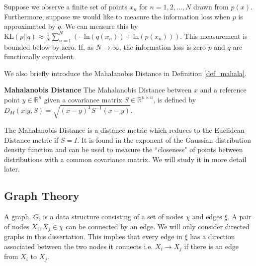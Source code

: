 \begin{thrm}
Suppose we observe a finite set of points $x_n$ for $n=1,2,..., N$ drawn from $p(x)$. Furthermore, suppose we would like to measure the information loss when $p$ is approximated by $q$. We can measure this by $\text{KL}(p||q) \approx \frac{1}{N}\sum_{n=1}^N\left(-\text{ln}(q(x_n)) + \text{ln}(p(x_n))\right)$. This measurement is bounded below by zero. If, as $N \rightarrow \infty$, the information loss is zero $p$ and $q$ are functionally equivalent.
\label{thrm_kl_sample}
\end{thrm}
We also briefly introduce the Mahalanobis Distance in Definition \ref{def_mahala}.
\begin{defn}
\textbf{Mahalanobis Distance} The Mahalanobis Distance between $x$ and a reference point $y \in \mathbb{R}^n$ given a covariance matrix $S \in \mathbb{R}^{n\times
n}$, is defined by $D_M(x|y, S) = \sqrt{(x-y)^TS^{-1}(x-y)}$. 
\label{def_mahala}
\end{defn}
The Mahalanobis Distance is a distance metric which reduces to the Euclidean Distance metric if $S=I$. It is found in the exponent of the Gaussian distribution density function and can be used to measure the ``closeness" of points between distributions with a common covariance matrix. We will study it in more detail later.
\subsection{Graph Theory}
\label{sec_graph_theory}
A graph, $G$, is a data structure consisting of a set of nodes $\chi$ and edges $\xi$. A pair of nodes $X_i, X_j \in \chi$ can be connected by an edge. We will only consider directed graphs in this dissertation. This implies that every edge in $\xi$ has a direction associated between the two nodes it connects i.e. $X_i \rightarrow X_j$ if there is an edge from $X_i$ to $X_j$.

